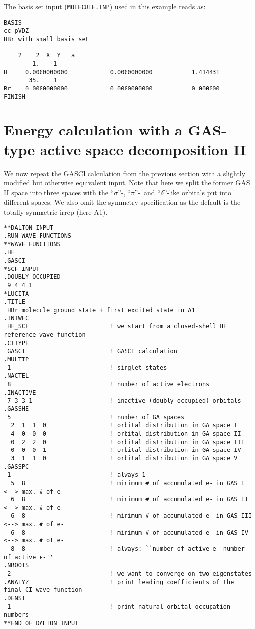 The basis set input (\verb|MOLECULE.INP|) used in this example reads as:

\begin{verbatim}
BASIS
cc-pVDZ
HBr with small basis set

    2    2  X  Y   a
        1.    1
H     0.0000000000            0.0000000000           1.414431
       35.    1
Br    0.0000000000            0.0000000000           0.000000
FINISH
\end{verbatim}

\section{Energy calculation with a GAS-type active space decomposition II}

We now repeat the GASCI calculation from the previous section 
with a slightly modified but otherwise equivalent input. Note that here we split the former GAS II space into three 
spaces with the ``$\sigma$''-, ``$\pi$''-\ and ``$\delta$''-like orbitals put into different spaces. We also omit 
the symmetry specification as the default is the totally symmetric irrep (here A1).

%
\begin{verbatim}
**DALTON INPUT
.RUN WAVE FUNCTIONS
**WAVE FUNCTIONS
.HF
.GASCI
*SCF INPUT
.DOUBLY OCCUPIED
 9 4 4 1
*LUCITA
.TITLE
 HBr molecule ground state + first excited state in A1
.INIWFC
 HF_SCF                       ! we start from a closed-shell HF reference wave function
.CITYPE
 GASCI                        ! GASCI calculation
.MULTIP
 1                            ! singlet states
.NACTEL
 8                            ! number of active electrons
.INACTIVE
 7 3 3 1                      ! inactive (doubly occupied) orbitals
.GASSHE
 5                            ! number of GA spaces
  2  1  1  0                  ! orbital distribution in GA space I
  4  0  0  0                  ! orbital distribution in GA space II
  0  2  2  0                  ! orbital distribution in GA space III
  0  0  0  1                  ! orbital distribution in GA space IV
  3  1  1  0                  ! orbital distribution in GA space V
.GASSPC
 1                            ! always 1
  5  8                        ! minimum # of accumulated e- in GAS I    <--> max. # of e-
  6  8                        ! minimum # of accumulated e- in GAS II   <--> max. # of e-
  6  8                        ! minimum # of accumulated e- in GAS III  <--> max. # of e-
  6  8                        ! minimum # of accumulated e- in GAS IV   <--> max. # of e-
  8  8                        ! always: ``number of active e- number of active e-''
.NROOTS
 2                            ! we want to converge on two eigenstates
.ANALYZ                       ! print leading coefficients of the final CI wave function
.DENSI
 1                            ! print natural orbital occupation numbers
**END OF DALTON INPUT
\end{verbatim}

